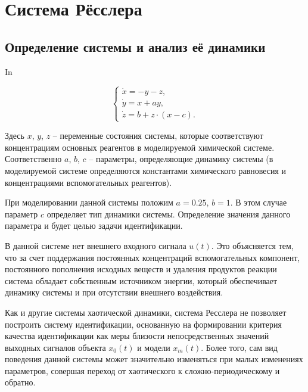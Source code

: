 
\FloatBarrier
\section{Система Рёсслера} %
\label{atu:sect:ross}


\subsection{Определение системы и анализ её динамики} %

In~\cite{neimark_stoch_chaos_vibro,koltsova_nl_dyn_chem,berje_order_in_chaos,chulichkcov_mm_ml_dyn}

\begin{equation}
\begin{cases}
  \dot{x}  = -y - z  ,  \\
  \dot{y}  = x + a y ,\\
  \dot{z}  = b + z \cdot ( x-c ) .
\end{cases}
\label{atu:eq:rossler}
\end{equation}

Здесь \(x\), \(y\), \(z\) -- переменные состояния системы,
которые соответствуют концентрациям основных реагентов
в моделируемой химической системе.
Соответственно \(a\), \(b\), \(c\) --
параметры, определяющие динамику системы
(в моделируемой системе определяются константами химического равновесия
и концентрациями вспомогательных реагентов).

При моделировании данной системы положим
\(a=0.25\), \(b=1\).
В этом случае параметр \(c\) определяет
тип динамики системы.
Определение значения данного параметра и будет
целью задачи идентификации.

В данной системе нет внешнего входного сигнала \( u(t) \).
Это объясняется тем, что за счет 
поддержания постоянных концентраций вспомогательных
компонент, постоянного пополнения исходных веществ
и удаления продуктов реакции система обладает
собственным источником энергии, который обеспечивает
динамику системы и при отсутствии 
внешнего воздействия.

Как и другие системы хаотической динамики, система Ресслера
не позволяет построить систему идентификации, основанную
на формировании критерия качества идентификации
как меры близости непосредственных значений выходных сигналов
объекта \( x_0(t) \) и модели \( x_m(t) \).
Более того, сам вид поведения данной системы может значительно изменяться
при малых изменениях параметров, совершая переход от
хаотического к сложно-периодическому и обратно.

